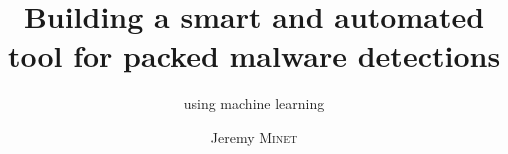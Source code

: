 \documentclass{EPL-master-thesis-covers-EN}
\title{Building a smart and automated tool for packed malware detections}
\subtitle{using machine learning}
\author{Jeremy \textsc{Minet}}
\begin{document}
  \maketitle
    
  \backcoverpage
\end{document}
